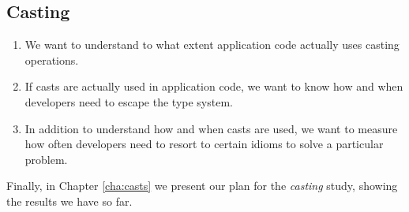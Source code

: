 \subsection*{Casting}
\begin{enumerate}[label=$CRQ\arabic*:$,ref=$CRQ\arabic*$,leftmargin=3.4\parindent]
\item\label{casts:rq1} {\bf \crqA}
We want to understand to what extent application code actually uses casting operations.

\item\label{casts:rq2} {\bf \crqB}
If casts are actually used in application code,
we want to know how and when developers need to escape the type system.

\item\label{casts:rq3} {\bf \crqC}
In addition to understand how and when casts are used,
we want to measure how often developers need to resort to certain idioms to solve a particular problem.
\end{enumerate}

Finally, in Chapter \ref{cha:casts} we present our plan for the \emph{casting} study,
showing the results we have so far.

